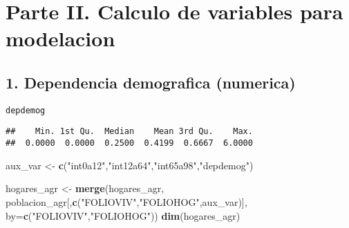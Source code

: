 \documentclass[11pt,]{article}
\newenvironment{Shaded}{\begin{snugshade}}{\end{snugshade}}
\newcommand{\KeywordTok}[1]{\textcolor[rgb]{0.13,0.29,0.53}{\textbf{#1}}}
\newcommand{\DataTypeTok}[1]{\textcolor[rgb]{0.13,0.29,0.53}{#1}}
\newcommand{\DecValTok}[1]{\textcolor[rgb]{0.00,0.00,0.81}{#1}}
\newcommand{\StringTok}[1]{\textcolor[rgb]{0.31,0.60,0.02}{#1}}
\newcommand{\CommentTok}[1]{\textcolor[rgb]{0.56,0.35,0.01}{\textit{#1}}}
\newcommand{\OperatorTok}[1]{\textcolor[rgb]{0.81,0.36,0.00}{\textbf{#1}}}
\newcommand{\NormalTok}[1]{#1}
\begin{document}
\section{Parte II. Calculo de variables para
modelacion}\label{parte-ii.-calculo-de-variables-para-modelacion}

\subsection{1. Dependencia demografica
(numerica)}\label{dependencia-demografica-numerica}

\texttt{depdemog}

\begin{Shaded}
\end{Shaded}

\begin{verbatim}
##    Min. 1st Qu.  Median    Mean 3rd Qu.    Max. 
##  0.0000  0.0000  0.2500  0.4199  0.6667  6.0000
\end{verbatim}

\begin{Shaded}
\begin{Highlighting}[]
\NormalTok{aux_var <-}\StringTok{ }\KeywordTok{c}\NormalTok{(}\StringTok{"int0a12"}\NormalTok{,}\StringTok{"int12a64"}\NormalTok{,}\StringTok{"int65a98"}\NormalTok{,}\StringTok{"depdemog"}\NormalTok{)}

\NormalTok{hogares_agr <-}\StringTok{ }\KeywordTok{merge}\NormalTok{(hogares_agr,}
\NormalTok{                     poblacion_agr[,}\KeywordTok{c}\NormalTok{(}\StringTok{"FOLIOVIV"}\NormalTok{,}\StringTok{"FOLIOHOG"}\NormalTok{,aux_var)],}
                     \DataTypeTok{by=}\KeywordTok{c}\NormalTok{(}\StringTok{"FOLIOVIV"}\NormalTok{,}\StringTok{"FOLIOHOG"}\NormalTok{))}
\KeywordTok{dim}\NormalTok{(hogares_agr)}
\end{Highlighting}
\end{Shaded}
\end{document}
